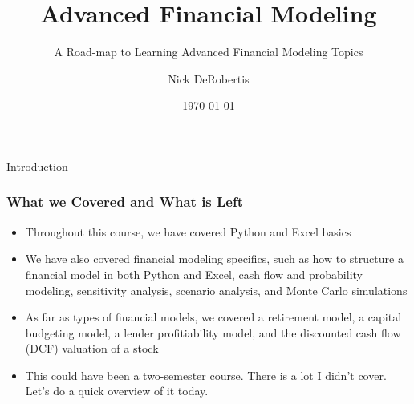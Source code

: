 \documentclass[handout, 11pt]{beamer}
\institute[UF]{\inst{1}
University of Florida\\
Department of Finance, Insurance, and Real Estate}
\begin{document}
\title[Modeling Road-map]{Advanced Financial Modeling}
\subtitle{A Road-map to Learning Advanced Financial Modeling Topics}
\author[DeRobertis]{Nick DeRobertis}
\date{\today}
\begin{frame}
\titlepage
\label{title-frame}
\end{frame}
\begin{section}{Introduction}
\begin{frame}
\frametitle{What we Covered and What is Left}
\begin{itemize}
\item Throughout this course, we have covered Python and Excel basics
\vfill
\item We have also covered financial modeling specifics, such as how to structure a financial model in both Python and Excel, cash flow and probability modeling, sensitivity analysis, scenario analysis, and Monte Carlo simulations
\vfill
\item As far as types of financial models, we covered a retirement model, a capital budgeting model, a lender profitiability model, and the discounted cash flow (DCF) valuation of a stock
\vfill
\item This could have been a two-semester course. There is a lot I didn't cover. Let's do a quick overview of it today.
\end{itemize}
\end{frame}
\end{section}
\end{document}

